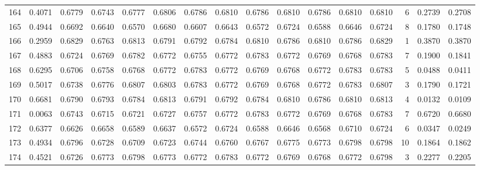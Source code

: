 \begin{tabular}{lrrrrrrrrrrrrrrr}
164 &      0.4071 &  0.6779 &  0.6743 &  0.6777 &  0.6806 &  0.6786 &  0.6810 &  0.6786 &  0.6810 &  0.6786 &   0.6810 &     0.6810 &      6 &                    0.2739 &                     0.2708 \\
165 &      0.4944 &  0.6692 &  0.6640 &  0.6570 &  0.6680 &  0.6607 &  0.6643 &  0.6572 &  0.6724 &  0.6588 &   0.6646 &     0.6724 &      8 &                    0.1780 &                     0.1748 \\
166 &      0.2959 &  0.6829 &  0.6763 &  0.6813 &  0.6791 &  0.6792 &  0.6784 &  0.6810 &  0.6786 &  0.6810 &   0.6786 &     0.6829 &      1 &                    0.3870 &                     0.3870 \\
167 &      0.4883 &  0.6724 &  0.6769 &  0.6782 &  0.6772 &  0.6755 &  0.6772 &  0.6783 &  0.6772 &  0.6769 &   0.6768 &     0.6783 &      7 &                    0.1900 &                     0.1841 \\
168 &      0.6295 &  0.6706 &  0.6758 &  0.6768 &  0.6772 &  0.6783 &  0.6772 &  0.6769 &  0.6768 &  0.6772 &   0.6783 &     0.6783 &      5 &                    0.0488 &                     0.0411 \\
169 &      0.5017 &  0.6738 &  0.6776 &  0.6807 &  0.6803 &  0.6783 &  0.6772 &  0.6769 &  0.6768 &  0.6772 &   0.6783 &     0.6807 &      3 &                    0.1790 &                     0.1721 \\
170 &      0.6681 &  0.6790 &  0.6793 &  0.6784 &  0.6813 &  0.6791 &  0.6792 &  0.6784 &  0.6810 &  0.6786 &   0.6810 &     0.6813 &      4 &                    0.0132 &                     0.0109 \\
171 &      0.0063 &  0.6743 &  0.6715 &  0.6721 &  0.6727 &  0.6757 &  0.6772 &  0.6783 &  0.6772 &  0.6769 &   0.6768 &     0.6783 &      7 &                    0.6720 &                     0.6680 \\
172 &      0.6377 &  0.6626 &  0.6658 &  0.6589 &  0.6637 &  0.6572 &  0.6724 &  0.6588 &  0.6646 &  0.6568 &   0.6710 &     0.6724 &      6 &                    0.0347 &                     0.0249 \\
173 &      0.4934 &  0.6796 &  0.6728 &  0.6709 &  0.6723 &  0.6744 &  0.6760 &  0.6767 &  0.6775 &  0.6773 &   0.6798 &     0.6798 &     10 &                    0.1864 &                     0.1862 \\
174 &      0.4521 &  0.6726 &  0.6773 &  0.6798 &  0.6773 &  0.6772 &  0.6783 &  0.6772 &  0.6769 &  0.6768 &   0.6772 &     0.6798 &      3 &                    0.2277 &                     0.2205 \\

\end{tabular}
